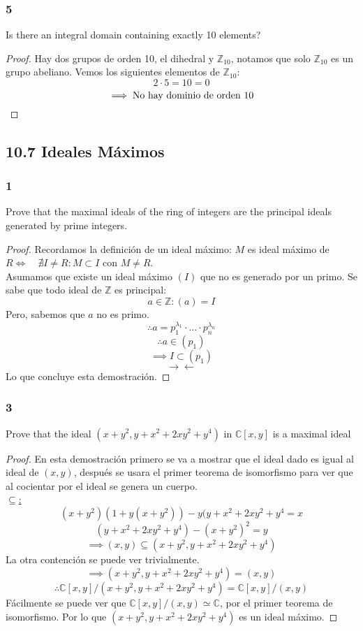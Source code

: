 \documentclass[11pt]{article}
\newcommand{\set}[1]{\mathbb{#1}}
\newcommand{\contr}{\rightarrow\leftarrow}
\theoremstyle{definition}
\begin{document}
        \subsubsection{5}
        Is there an integral domain containing exactly 10 elements?
        \begin{proof}
            Hay dos grupos de orden 10, el dihedral y $\set{Z}_{10}$, notamos que solo $\set{Z}_{10}$ es un grupo abeliano. Vemos los siguientes elementos de $\set{Z}_{10}$:
            \[2\cdot 5=10=0\]
            \[\implies \textrm{No hay dominio de orden 10}\qedhere\]
        \end{proof}

        \subsection{10.7 Ideales Máximos}
        \subsubsection{1}
        Prove that the maximal ideals of the ring of integers are the principal ideals generated by prime integers.
        \begin{proof}
            Recordamos la definición de un ideal máximo: $M$ es ideal máximo de $R\iff\quad \nexists I\neq R:M\subset I$ con $M\neq R$.\\
            Asumamos que existe un ideal máximo $(I)$ que no es generado por un primo. Se sabe que todo ideal de $\set{Z}$ es principal:
            \[a\in\set{Z}:(a)=I\]
            Pero, sabemos que $a$ no es primo.
            \[\therefore a=p_1^{\lambda_1}\cdot...\cdot p_n^{\lambda_n}\]
            \[\therefore a\in (p_1)\]
            \[\implies I\subset (p_1)\]
            \[\contr\]
            Lo que concluye esta demostración.
        \end{proof}

        \subsubsection{3}
        Prove that the ideal $(x+y^2,y+x^2+2xy^2+y^4)$ in $\set{C}[x,y]$ is a maximal ideal
        \begin{proof}
            En esta demostración primero se va a mostrar que el ideal dado es igual al ideal de $(x,y)$, después se usara el primer teorema de isomorfismo para ver que al cocientar por el ideal se genera un cuerpo.\\
            \underline{$\subseteq$:}
            \[(x+y^2)(1+y(x+y^2))-y(y+x^2+2xy^2+y^4=x\]
            \[(y+x^2+2xy^2+y^4)-(x+y^2)^2=y\]
            \[\implies (x,y)\subseteq (x+y^2,y+x^2+2xy^2+y^4)\]
            La otra contención se puede ver trivialmente.
            \[\implies (x+y^2,y+x^2+2xy^2+y^4)=(x,y)\]
            \[\therefore \set{C}[x,y]/(x+y^2,y+x^2+2xy^2+y^4)=\set{C}[x,y]/(x,y)\]
            Fácilmente se puede ver que $\set{C}[x,y]/(x,y)\simeq \set{C}$, por el primer teorema de isomorfismo. Por lo que $(x+y^2,y+x^2+2xy^2+y^4)$ es un ideal máximo.
        \end{proof}
\end{document}
